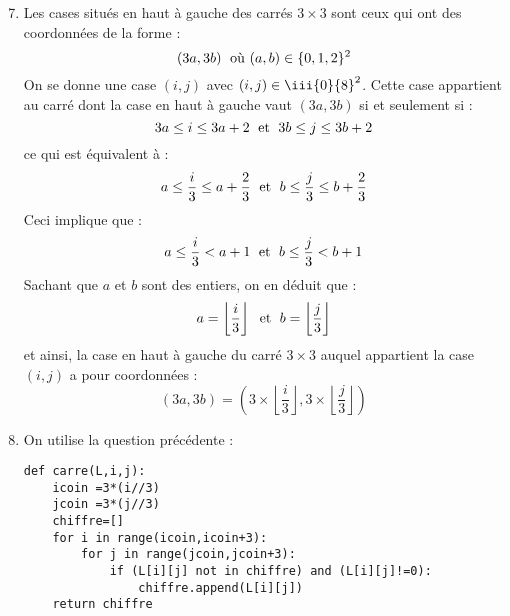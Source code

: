 \documentclass[a4paper,twoside,french,10pt]{VcCours}
\begin{document}
\begin{enumerate}
\setcounter{enumi}{6}
\item Les cases situés en haut à gauche des carrés $3 \times 3$ sont ceux qui ont des coordonnées de la forme :
$$ (3a,3b) \; \hbox{ où } (a,b) \in \lbrace 0,1,2 \rbrace^2$$
On se donne une case $(i,j)$ avec $(i,j) \in \iii{0}{8}^2$. Cette case appartient au carré dont la case en haut à gauche vaut $(3a,3b)$ si et seulement si :
$$ 3a \leq i \leq 3a+2 \; \hbox{ et } \; 3b \leq j \leq 3b+2$$
ce qui est équivalent à :
$$ a \leq \dfrac{i}{3} \leq a + \dfrac{2}{3} \; \hbox{ et } \; b \leq \dfrac{j}{3} \leq b + \dfrac{2}{3}$$
Ceci implique que :
$$  a \leq \dfrac{i}{3} <a+1 \; \hbox{ et } \; b \leq \dfrac{j}{3}<b+1$$
Sachant que $a$ et $b$ sont des entiers, on en déduit que :
$$ a = \left\lfloor \dfrac{i}{3} \right\rfloor \; \hbox{ et } \; b = \left\lfloor \dfrac{j}{3} \right\rfloor$$
et ainsi, la case en haut à gauche du carré $3 \times 3$ auquel appartient la case $(i,j)$ a pour coordonnées :
$$  (3a,3b)= \left( 3 \times \left\lfloor \dfrac{i}{3} \right\rfloor , 3 \times \left\lfloor \dfrac{j}{3} \right\rfloor \right)$$
\item On utilise la question précédente :

\begin{center}
\begin{minipage}{0.7\textwidth}
		
\begin{lstlisting}
def carre(L,i,j):
    icoin =3*(i//3)
    jcoin =3*(j//3)
    chiffre=[]
    for i in range(icoin,icoin+3):
        for j in range(jcoin,jcoin+3):
            if (L[i][j] not in chiffre) and (L[i][j]!=0):
                chiffre.append(L[i][j]) 
    return chiffre
\end{lstlisting}

\end{minipage}
\end{center}
\end{enumerate}
\end{document}
